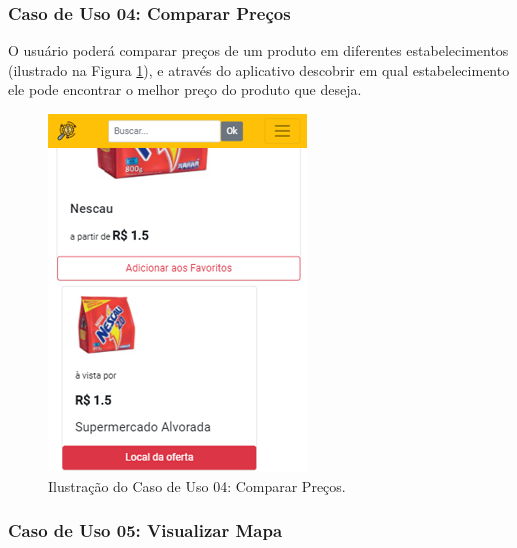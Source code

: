 \subsubsection{Caso de Uso 04: Comparar Preços}

O usuário poderá comparar preços de um produto em diferentes estabelecimentos (ilustrado na Figura  \ref{fig:comparar}), e através do aplicativo descobrir em qual estabelecimento ele pode encontrar o melhor preço do produto que deseja.

\begin{figure}[H]
\centering
\includegraphics[width=\linewidth]{figuras/tela-comparar.png}
\caption{Ilustração do Caso de Uso 04: Comparar Preços.}
\label{fig:comparar}
\end{figure}

\subsubsection{Caso de Uso 05: Visualizar Mapa}

